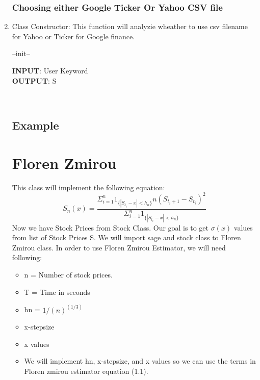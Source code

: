 \begin{enumerate}
\subsubsection{Choosing either Google Ticker Or Yahoo CSV file}
\item  Class Constructor: This function will analyzie wheather to use csv filename for Yahoo or Ticker 
for Google finance.
\begin{algorithm}
\caption{--init--}
\bigskip
\textbf{INPUT}: User Keyword  \\
\textbf{OUTPUT}: S 
\begin{algorithmic}[1]
  \\
\end{algorithmic}
\end{algorithm}
\subsection {Example}
\newpage
\section{Floren Zmirou}
This class will implement the following equation:
\begin{equation}\label{florenZmirouEquation}
S_n(x) = \frac{\Sigma_{i=1}^{n} 1_{\{|S_{t_i}-x|<h_n\}} n (S_{t_i+1}-S_{t_i})^2}{\Sigma_{i=1}^{n} 1_{\{|S_{t_i}-x|<h_n\}}}
\end{equation}
Now we have Stock Prices from Stock Class. Our goal is to get $\sigma(x)$ values from list of Stock Prices S.
We will import sage and stock class to Floren Zmirou class. In order to use Floren Zmirou Estimator, we will need following:\\
\begin{itemize}
  \item n = Number of stock prices.
  \item T = Time in seconds
  \item hn = $1/(n)^(1/3)$
  \item x-step\-size
  \item x values
\end{itemize}
\begin{itemize}
  \item We will implement hn, x-step\-size, and x values so we can use the terms in Floren zmirou estimator equation (1.1).
\end{itemize}

\end{enumerate}

